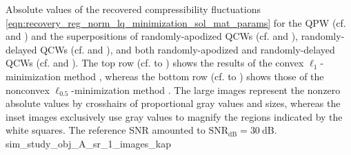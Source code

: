 %
{%
 Absolute values of
 the recovered compressibility fluctuations
 \eqref{eqn:recovery_reg_norm_lq_minimization_sol_mat_params} for
 the \acl{QPW}
 (cf.
  and
 ) and
 the superpositions of
 randomly-apodized \acfp{QCW}
 (cf.
  and
 ),
 randomly-delayed \acp{QCW}
 (cf.
  and
 ), and both
 randomly-apodized and
 randomly-delayed \acp{QCW}
 (cf.
  and
 ).
 The top row
 (cf.
  to
 ) shows
 the results of
 the convex $\ell_{1}$-minimization method
 , whereas
 the bottom row
 (cf.
  to
 ) shows
 those of
 the nonconvex $\ell_{0.5}$-minimization method
 .
 The large images represent
 the nonzero absolute values by
 crosshairs of
 proportional gray values and
 sizes, whereas
 the inset images exclusively use
 gray values to magnify
 the regions indicated by
 the white squares.
 The reference \ac{SNR} amounted to
 $\text{SNR}_{\text{dB}} = \SI{30}{\deci\bel}$.
}%
{sim_study_obj_A_sr_1_images_kap}

